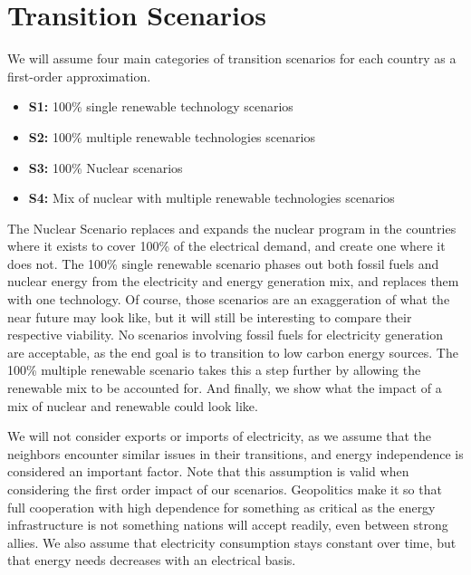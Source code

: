 \setchapterpreamble[u]{\margintoc}
\chapter{Transition Scenarios}

We will assume four main categories of transition scenarios for each country as a first-order approximation.

\begin{itemize}
	\item \textbf{S1:} 100\% single renewable technology scenarios
	\item \textbf{S2:} 100\% multiple renewable technologies scenarios
	\item \textbf{S3:} 100\% Nuclear scenarios
	\item \textbf{S4:} Mix of nuclear with multiple renewable technologies scenarios
\end{itemize}


The Nuclear Scenario replaces and expands the nuclear program in the countries where it exists to cover 100\% of the electrical demand, and create one where it does not. The 100\% single renewable scenario phases out both fossil fuels and nuclear energy from the electricity and energy generation mix, and replaces them with one technology. Of course, those scenarios are an exaggeration of what the near future may look like, but it will still be interesting to compare their respective viability. No scenarios involving fossil fuels for electricity generation are acceptable, as the end goal is to transition to low carbon energy sources. The 100\% multiple renewable scenario takes this a step further by allowing the renewable mix to be accounted for. And finally, we show what the impact of a mix of nuclear and renewable could look like.

We will not consider exports or imports of electricity, as we assume that the neighbors encounter similar issues in their transitions, and energy independence is considered an important factor. Note that this assumption is valid when considering the first order impact of our scenarios. Geopolitics make it so that full cooperation with high dependence for something as critical as the energy infrastructure is not something nations will accept readily, even between strong allies. We also assume that electricity consumption stays constant over time, but that energy needs decreases with an electrical basis.

